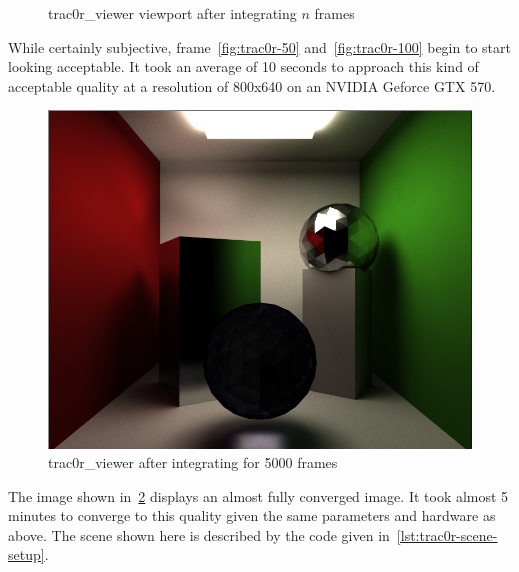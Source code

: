 \documentclass[
  twoside,
  11pt, a4paper,
  footinclude=true,
  headinclude=true,
  cleardoublepage=empty
]{scrreprt}
\begin{document}
\begin{figure}[H]
    \centering
    \caption{trac0r\_viewer viewport after integrating \(n\) frames}
    \label{fig:trac0r_n_frames}
\end{figure}

While certainly subjective, frame~\ref{fig:trac0r-50} and~\ref{fig:trac0r-100} begin to start looking
acceptable. It took an average of 10 seconds to approach this kind of acceptable quality at a
resolution of 800x640 on an NVIDIA Geforce GTX 570.

\begin{figure}[H]
    \includegraphics[scale=0.5]{trac0r-5000.png}
    \centering
    \caption{trac0r\_viewer after integrating for 5000 frames}
    \label{fig:trac0r-5000}
\end{figure}

The image shown in~\ref{fig:trac0r-5000} displays an almost fully converged image. It took almost 5
minutes to converge to this quality given the same parameters and hardware as above. The scene
shown here is described by the code given in~\ref{lst:trac0r-scene-setup}.
\end{document}
